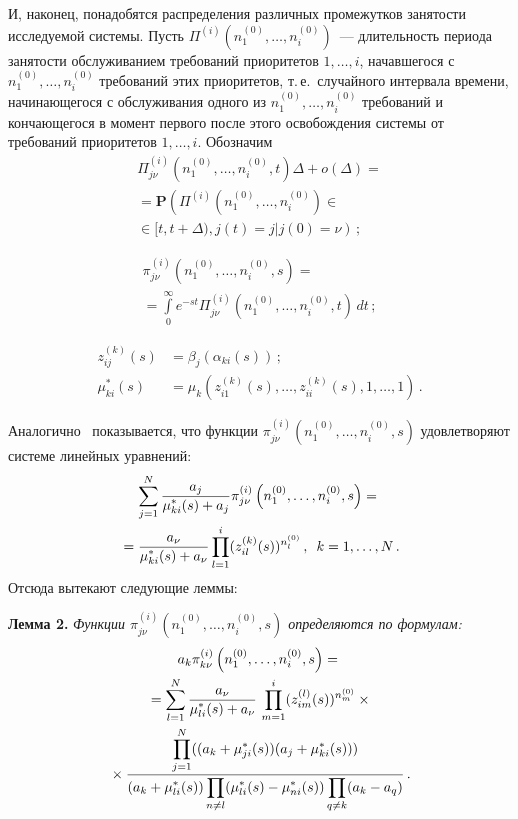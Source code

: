 \begin{multicols}{2}
И, наконец, понадобятся распределения различных промежутков
занятости исследуемой сис\-темы. Пусть $\Pi^{(i)}\left(n_1^{(0)},
\ldots,n_i^{(0)}\right)$~--- длительность\linebreak
 периода занятости
обслуживанием требований приоритетов $1,\ldots,i$, начавшегося с
$n_1^{(0)},\ldots,n_i^{(0)}$ требований этих приоритетов, т.\,е.\
случайного интервала времени, начинающегося с обслуживания одного из
$n_1^{(0)},\ldots,n_i^{(0)}$ требований и кончающегося в момент
первого после этого освобождения системы от требований приоритетов
$1,\ldots,i$. Обозначим
\begin{multline*}
\Pi_{j\nu}^{(i)}\left(n_1^{(0)},\ldots,n_i^{(0)},t\right)\Delta+o(\Delta)={}\\
{}=\mathbf{P}\left(\Pi^{(i)}\left(n_1^{(0)},
\ldots,n_i^{(0)}\right)\in{}\right.\\
\left.{}\in[t,t+\Delta),j(t)=j|j(0)=\nu\right)\,;
\end{multline*}

\vspace*{-12pt}

\noindent
\begin{multline*}
\pi_{j\nu}^{(i)}\left(n_1^{(0)},\ldots,n_i^{(0)},s\right)={}\\
{}=
\int\limits_0^{\infty}e^{-st}\Pi_{j\nu}^{(i)}\left(n_1^{(0)},\ldots,n_i^{(0)},t\right)\,dt\,;
\end{multline*}

\vspace*{-12pt}

\noindent
\begin{align*}
z_{ij}^{(k)}(s)&=\beta_j(\alpha_{ki}(s))\,;\\
\mu_{ki}^{*}(s)&=\mu_k\left(z_{i1}^{(k)}(s),\ldots,z_{ii}^{(k)}(s),1,\ldots,1\right)\,.
\end{align*}

Аналогично~\cite{2-u} показывается, что функции 
$\pi_{j\nu}^{(i)}\left(n_1^{(0)},\ldots,n_i^{(0)},s\right)$ удовлетворяют системе линейных
уравнений:
\begin{multline*}
\sum\limits_{j=1}^N\displaystyle\frac{\displaystyle a_j\mathstrut}{\displaystyle \mu_{ki}^{*}(s)+
a_j\mathstrut}\pi_{j\nu}^{(i)}\left(n_1^{(0)},\ldots,n_i^{(0)},s\right)={}\\
{}=
\displaystyle\frac{\displaystyle a_{\nu}\mathstrut}{\displaystyle \mu_{ki}^{*}(s)+a_{\nu}\mathstrut}\prod\limits_{l=1}^i (z_{il}^{(k)}(s))^{n_l^{(0)}}\,,
\enskip k=1,\ldots,N\,.
\end{multline*}
Отсюда вытекают следующие леммы:

\medskip

\noindent
\textbf{Лемма 2.} \textit{Функции  $\pi_{j\nu}^{(i)}\left(n_1^{(0)},\ldots,n_i^{(0)},s\right)$ определяются по формулам:}
\begin{multline*}
a_k\pi_{k\nu}^{(i)}\left(n_1^{(0)},\ldots,n_i^{(0)},s\right)={}\\
{}=
\sum\limits_{l=1}^N\displaystyle\frac{\displaystyle a_{\nu}\mathstrut}{\displaystyle \mu_{li}^{*}(s)+a_{\nu}\mathstrut}\,
\prod\limits_{m=1}^i (z_{im}^{(l)}(s))^{n_m^{(0)}}\times{} \\ 
{}\times\displaystyle\frac{\displaystyle \prod\limits_{j=1}^N((a_k+\mu_{ji}^{*}(s))(a_j+\mu_{ki}^{*}(s)))\mathstrut}{\displaystyle (a_k+\mu_{li}^{*}(s))\prod\limits_{n\ne l}(\mu_{li}^{*}(s)-\mu_{ni}^{*}(s))\prod\limits_{q\ne k}(a_k-a_q)\mathstrut}\,.
\end{multline*}


\end{multicols}
